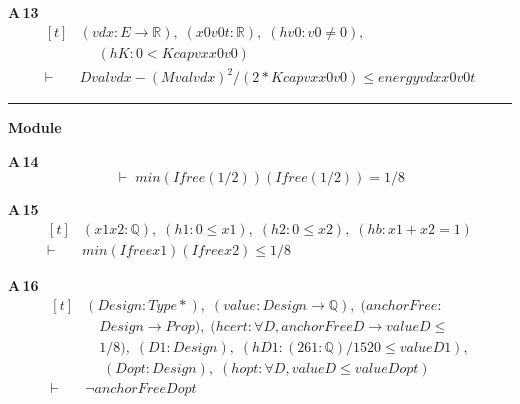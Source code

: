 \noindent\textbf{A\,13}\quad{}
{\footnotesize\[ \begin{aligned}[t]
&(\mathit{v} \mathit{d} \mathit{x} : \mathit{E} \to \mathbb{R} ),\; (\mathit{x0} \mathit{v0} \mathit{t} : \mathbb{R} ),\; (\mathit{hv0} : \mathit{v0} \neq 0),\\
&\quad \; (\mathit{hK} : 0 < \mathit{Kcap} \mathit{v} \mathit{x} \mathit{x0} \mathit{v0})\\
\vdash\;&\mathit{Dval} \mathit{v} \mathit{d} \mathit{x} - (\mathit{Mval} \mathit{v} \mathit{d} \mathit{x}) ^{2} / (2 * \mathit{Kcap} \mathit{v} \mathit{x} \mathit{x0} \mathit{v0}) \leq \mathit{energy} \mathit{v} \mathit{d} \mathit{x} \mathit{x0} \mathit{v0} \mathit{t}
\end{aligned} \]}

\vspace{4pt}\noindent\rule{\columnwidth}{0.4pt}\par\vspace{2pt}
\noindent\textbf{Module }\par\vspace{3pt}

\noindent\textbf{A\,14}\quad{}
{\footnotesize\[ \vdash\; \mathit{min} (\mathit{Ifree} (1/2)) (\mathit{Ifree} (1/2)) = 1 / 8 \]}

\noindent\textbf{A\,15}\quad{}
{\footnotesize\[ \begin{aligned}[t]
&(\mathit{x1} \mathit{x2} : \mathbb{Q} ),\; (\mathit{h1} : 0 \leq \mathit{x1}),\; (\mathit{h2} : 0 \leq \mathit{x2}),\; (\mathit{hb} : \mathit{x1} + \mathit{x2} = 1)\\
\vdash\;&\mathit{min} (\mathit{Ifree} \mathit{x1}) (\mathit{Ifree} \mathit{x2}) \leq 1 / 8
\end{aligned} \]}

\noindent\textbf{A\,16}\quad{}
{\footnotesize\[ \begin{aligned}[t]
&(\mathit{Design} : \mathit{Type}*),\; (\mathit{value} : \mathit{Design} \to \mathbb{Q} ),\; (\mathit{anchorFree} :\\
&\quad \mathit{Design} \to \mathit{Prop}),\; (\mathit{hcert} : \forall \mathit{D}, \mathit{anchorFree} \mathit{D} \to \mathit{value} \mathit{D} \leq\\
&\quad 1/8),\; (\mathit{D1} : \mathit{Design}),\; (\mathit{hD1} : (261 : \mathbb{Q} )/1520 \leq \mathit{value} \mathit{D1}),\\
&\quad \; (\mathit{Dopt} : \mathit{Design}),\; (\mathit{hopt} : \forall \mathit{D}, \mathit{value} \mathit{D} \leq \mathit{value} \mathit{Dopt})\\
\vdash\;&\neg \mathit{anchorFree} \mathit{Dopt}
\end{aligned} \]}

